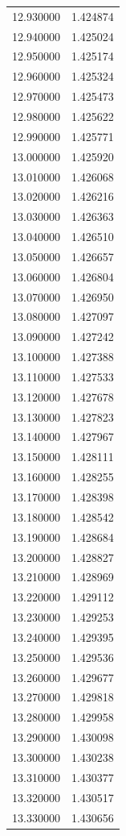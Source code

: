 \begin{tabular}{rr}
12.930000 & 1.424874 \\
12.940000 & 1.425024 \\
12.950000 & 1.425174 \\
12.960000 & 1.425324 \\
12.970000 & 1.425473 \\
12.980000 & 1.425622 \\
12.990000 & 1.425771 \\
13.000000 & 1.425920 \\
13.010000 & 1.426068 \\
13.020000 & 1.426216 \\
13.030000 & 1.426363 \\
13.040000 & 1.426510 \\
13.050000 & 1.426657 \\
13.060000 & 1.426804 \\
13.070000 & 1.426950 \\
13.080000 & 1.427097 \\
13.090000 & 1.427242 \\
13.100000 & 1.427388 \\
13.110000 & 1.427533 \\
13.120000 & 1.427678 \\
13.130000 & 1.427823 \\
13.140000 & 1.427967 \\
13.150000 & 1.428111 \\
13.160000 & 1.428255 \\
13.170000 & 1.428398 \\
13.180000 & 1.428542 \\
13.190000 & 1.428684 \\
13.200000 & 1.428827 \\
13.210000 & 1.428969 \\
13.220000 & 1.429112 \\
13.230000 & 1.429253 \\
13.240000 & 1.429395 \\
13.250000 & 1.429536 \\
13.260000 & 1.429677 \\
13.270000 & 1.429818 \\
13.280000 & 1.429958 \\
13.290000 & 1.430098 \\
13.300000 & 1.430238 \\
13.310000 & 1.430377 \\
13.320000 & 1.430517 \\
13.330000 & 1.430656 \\

\end{tabular}
